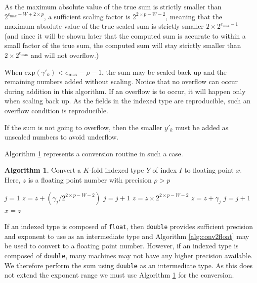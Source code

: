 \documentclass[12pt]{article}
\providecommand{\exp}{\ensuremath{\text{exp}}}
\providecommand{\max}{\ensuremath{\text{max}}}
\theoremstyle{definition}
\newtheorem{alg}{Algorithm}[section]
\numberwithin{equation}{section}
\numberwithin{figure}{section}
\begin{document}
    As the maximum absolute value of the true sum is strictly smaller than $2^{e_{\max} - W + 2 \times p}$, a sufficient scaling factor is $2^{2 \times p - W - 2}$, meaning that the maximum absolute value of the true scaled sum is strictly smaller $2 \times 2^{e_{\max} - 1}$ (and since it will be shown later that the computed sum is accurate to within a small factor of the true sum, the computed sum will stay strictly smaller than $2 \times 2^{e_{\max}}$ and will not overflow.)

  When $\exp(\gamma'_k) < e_{\max} - \rho - 1$, the sum may be scaled back up and the remaining numbers added without scaling. Notice that no overflow can occur during addition in this algorithm. If an overflow is to occur, it will happen only when scaling back up. As the fields in the indexed type are reproducible, such an overflow condition is reproducible.

    If the sum is not going to overflow, then the smaller $y'_k$ must be added as unscaled numbers to avoid underflow.

    Algorithm \ref{alg:conv2floatoverflow} represents a conversion routine in such a case.

    \begin{samepage}
    \begin{alg}
      Convert a $K$-fold indexed type $Y$ of index $I$ to floating point $x$. Here, $z$ is a floating point number with precision $\rho > p$
      \begin{algorithmic}[1]
          \State $j = 1$
          \While{$j \leq 2 \times K$ and $\exp(\gamma_j) \geq e_{\max} - \rho - 1$}
            \State $z = z + (\gamma_j / 2^{2 \times p - W - 2})$
            \State $j = j + 1$
          \EndWhile
          \State $z = z \times 2^{2 \times p - W - 2}$
            \State $z = z + \gamma_j$
            \State $j = j + 1$
          \EndWhile
          \State $x = z$
        \EndFunction
      \end{algorithmic}
      \label{alg:conv2floatoverflow}
    \end{alg}
    \end{samepage}

    If an indexed type is composed of \texttt{float}, then \texttt{double} provides sufficient precision and exponent to use as an intermediate type and Algorithm \ref{alg:conv2float} may be used to convert to a floating point number.
    However, if an indexed type is composed of \texttt{double}, many machines may not have any higher precision available. We therefore perform the sum using \texttt{double} as an intermediate type. As this does not extend the exponent range we must use Algorithm \ref{alg:conv2floatoverflow} for the conversion.
\end{document}
